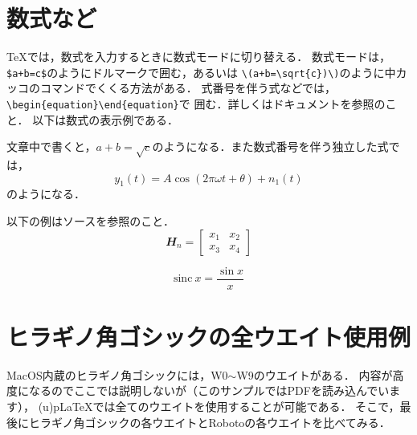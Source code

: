 \section{数式など}

{\TeX}では，数式を入力するときに数式モードに切り替える．
数式モードは，\verb|$a+b=c$|のようにドルマークで囲む，あるいは
\verb|\(a+b=\sqrt{c})\)|のように中カッコのコマンドでくくる方法がある．
式番号を伴う式などでは，\verb|\begin{equation}\end{equation}|で
囲む．詳しくはドキュメントを参照のこと．
以下は数式の表示例である．

文章中で書くと，\(a+b=\sqrt{c}\)のようになる．また数式番号を伴う独立した式では，
\begin{equation}
y_1(t) = A\cos(2\pi\omega t + \theta) + n_1(t)
\end{equation}
のようになる．

以下の例はソースを参照のこと．
\begin{equation}
\mathbfit{H}_n = \begin{bmatrix} x_1 & x_2\\ x_3 & x_4 \end{bmatrix}
\end{equation}

\begin{equation}
\mathrm{sinc\ }x = \frac{\sin x}{x}
\end{equation}


\section{ヒラギノ角ゴシックの全ウエイト使用例}

MacOS内蔵のヒラギノ角ゴシックには，W0$\sim$W9のウエイトがある．
内容が高度になるのでここでは説明しないが（このサンプルではPDFを読み込んでいます），
(u){p\LaTeX}では全てのウエイトを使用することが可能である．
そこで，最後にヒラギノ角ゴシックの各ウエイトとRobotoの各ウエイトを比べてみる．

